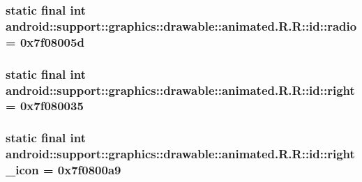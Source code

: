 \hypertarget{classandroid_1_1support_1_1graphics_1_1drawable_1_1animated_1_1_r_1_1id_c0f64d7b30599d86b3e8225c8ad8b32f}{
\subsubsection[{radio}]{\setlength{\rightskip}{0pt plus 5cm}static final int android::support::graphics::drawable::animated.R.R::id::radio = 0x7f08005d}}
\label{classandroid_1_1support_1_1graphics_1_1drawable_1_1animated_1_1_r_1_1id_c0f64d7b30599d86b3e8225c8ad8b32f}


\hypertarget{classandroid_1_1support_1_1graphics_1_1drawable_1_1animated_1_1_r_1_1id_c797725ce3ba0a5baeb4279f48dfb991}{
\subsubsection[{right}]{\setlength{\rightskip}{0pt plus 5cm}static final int android::support::graphics::drawable::animated.R.R::id::right = 0x7f080035}}
\label{classandroid_1_1support_1_1graphics_1_1drawable_1_1animated_1_1_r_1_1id_c797725ce3ba0a5baeb4279f48dfb991}


\hypertarget{classandroid_1_1support_1_1graphics_1_1drawable_1_1animated_1_1_r_1_1id_f6ba5872dced9d43d0c9f98de38eeed5}{
\subsubsection[{right\_\-icon}]{\setlength{\rightskip}{0pt plus 5cm}static final int android::support::graphics::drawable::animated.R.R::id::right\_\-icon = 0x7f0800a9}}
\label{classandroid_1_1support_1_1graphics_1_1drawable_1_1animated_1_1_r_1_1id_f6ba5872dced9d43d0c9f98de38eeed5}


